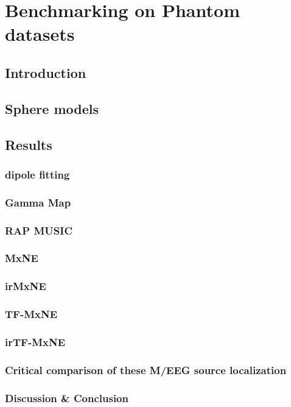 
\chapter{Benchmarking on Phantom datasets}
\label{chapter:benchmark}

\section{Introduction}
\section{Sphere models}
\section{Results}
\subsection{dipole fitting}
\subsection{Gamma Map}
\subsection{RAP MUSIC}
\subsection{MxNE}
\subsection{irMxNE}
\subsection{TF-MxNE}
\subsection{irTF-MxNE}
\subsection{Critical comparison of these M/EEG source localization}
\subsection{Discussion \& Conclusion}